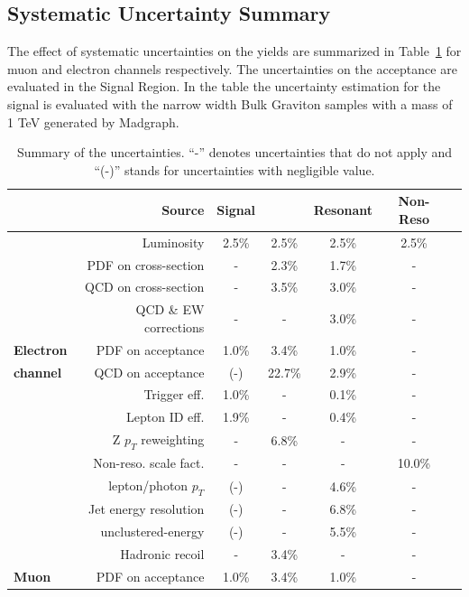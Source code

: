 \subsection{Systematic Uncertainty Summary}
The effect of systematic uncertainties on the yields are summarized in Table~\ref{tab:unc_summary} for muon and electron channels respectively. The uncertainties on the acceptance are evaluated in the Signal Region. In the table the uncertainty estimation for the signal is evaluated with the narrow width Bulk Graviton samples with a mass of 1 TeV generated by Madgraph.
\begin{table}[htbp]
\caption{Summary of the uncertainties. ``-'' denotes uncertainties that do not apply and ``(-)'' stands for uncertainties with negligible value.} 
\label{tab:unc_summary}
\begin{center}
\begin{footnotesize}
\begin{tabular}{l r c c c c c }
\hline\hline
%
{}	&	Source				&	Signal 	&	\Zjets		&	Resonant		&	Non-Reso 				\\ \hline\hline
{}	&	Luminosity			&	2.5\%	&	2.5\%		&	2.5\%			&	2.5\%					\\
{}	&	PDF on cross-section		&	-	&	2.3\%		&	1.7\%			&	-						\\
{}	&	QCD on cross-section		&	-	&	3.5\%		&	3.0\%			&	-						\\
{}	&	QCD \& EW corrections		&	-	&	-		&	3.0\%			&	-						\\
\hline\hline
{\bf Electron}&PDF on acceptance		&	1.0\%	&	3.4\%		&	1.0\%			&	-						\\
{\bf channel}&QCD on acceptance			&  	(-)	&	22.7\%		&	2.9\%			&	-						\\ 
{}	&	Trigger eff.			&	1.0\%	&	-		&	0.1\%			&	-						\\
{}	&	Lepton ID eff.			&	1.9\%	&	-		&	0.4\%			&	-						\\
{}	&	Z $p_T$ reweighting		&	-	&	6.8\%		&	-			&	-						\\
{}	&	Non-reso. scale fact.		&	-	&	-		&	-			&	10.0\%					\\ 
{}	&	\ptmiss lepton/photon $p_T$ 	&	(-)	&	-		&	4.6\%			&	-						\\
{}	&	\ptmiss Jet energy resolution	&	(-)	&	-		&	6.8\%			&	-						\\
{}	&	\ptmiss unclustered-energy		&	(-)	&	-		&	5.5\%			&	-						\\
{}	&	\ptmiss Hadronic recoil		&	-	&	3.4\%		&	-			&	-						\\ 
\hline\hline
{\bf Muon}&PDF on acceptance			&	1.0\%	&	3.4\%		&	1.0\%			&	-						\\

\end{tabular}
\end{footnotesize}
\end{center}
\end{table}

